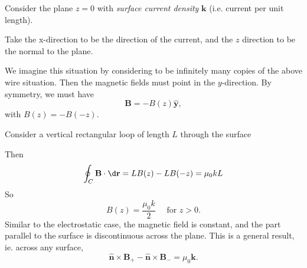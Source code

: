 \documentclass[a4paper]{article}
\begin{document}
\begin{eg}
  Consider the plane $z = 0$ with \emph{surface current density} $\mathbf{k}$ (i.e. current per unit length).
  \begin{center}
  \end{center}
  Take the x-direction to be the direction of the current, and the $z$ direction to be the normal to the plane.

  We imagine this situation by considering to be infinitely many copies of the above wire situation. Then the magnetic fields must point in the $y$-direction. By symmetry, we must have
  \[
    \mathbf{B} = -B(z) \hat{\mathbf{y}},
  \]
  with $B(z) = -B(-z)$.

  Consider a vertical rectangular loop of length $L$ through the surface
  \begin{center}
  \end{center}
  Then
  \[
    \oint_C \mathbf{B}\cdot \d \mathbf{r} = LB(z) - LB(-z) = \mu_0 kL
  \]
  So
  \[
    B(z) = \frac{\mu_0 k}{2}\quad\text{ for }z > 0.
  \]
  Similar to the electrostatic case, the magnetic field is constant, and the part parallel to the surface is discontinuous across the plane. This is a general result, ie. across any surface,
  \[
    \hat {\mathbf{n}} \times \mathbf{B}_+ - \hat{\mathbf{n}}\times \mathbf{B}_{-} = \mu_0 \mathbf{k}.
  \]
\end{eg}
\end{document}
